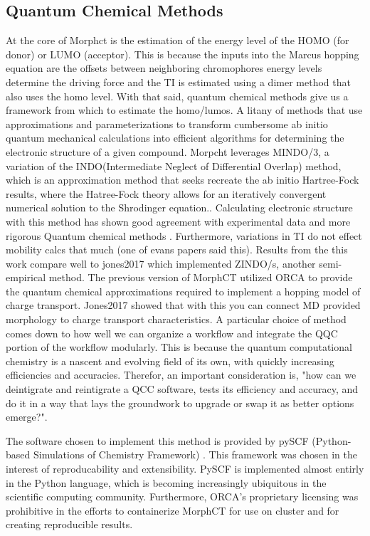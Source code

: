 \subsection{Quantum Chemical Methods}

At the core of Morphct is the estimation of the energy level of the HOMO (for donor) or LUMO (acceptor). This is because 
the inputs into the Marcus hopping equation are the offsets between neighboring  chromophores energy levels
determine the driving force and the TI is estimated using a dimer method that also uses the homo level. 
With that said, quantum chemical methods give us a framework from which to estimate the homo/lumos. A litany of
methods that use approximations and parameterizations to transform cumbersome ab initio quantum mechanical 
calculations into efficient algorithms for determining the electronic structure of a given compound. Morpcht 
leverages MINDO/3, a variation of the INDO(Intermediate Neglect of Differential Overlap) method,
which is an approximation method that seeks recreate the ab initio Hartree-Fock
results, where the Hatree-Fock theory allows for an iteratively convergent numerical solution to the Shrodinger equation.\cite{Thiel2014}. Calculating electronic structure with this method has
shown good agreement with experimental data and more rigorous Quantum chemical
methods 
\cite{Bredas2002}. Furthermore, variations in TI do not effect mobility calcs
that much (one of evans papers said this).  Results
from the this work compare well to jones2017 which implemented ZINDO/s, another
semi-empirical method. The
previous version of MorphCT utilized ORCA \cite{Neese2012b}to provide the quantum chemical
approximations required to implement
a hopping model of charge transport. Jones2017 showed that with this you can connect MD
provided morphology to charge transport characteristics. A particular 
choice of method comes down to how well we can organize a workflow and integrate the QQC portion of the
workflow modularly. This is because the quantum computational chemistry is a nascent and evolving field of its
own, with quickly increasing efficiencies and accuracies. Therefor, an important consideration is, "how can we
deintigrate and reintigrate a QCC software, tests its efficiency and accuracy, and do it in a way that lays
the groundwork to upgrade or swap it as better options emerge?". 

The software chosen to implement this method is
provided by pySCF (Python-based Simulations of Chemistry Framework) \cite{Sun2018a}. This framework
was chosen in the interest of reproducability and extensibility. PySCF is implemented almost entirly in the Python 
language, which is becoming increasingly ubiquitous in the scientific computing community. Furthermore,
ORCA's proprietary licensing was prohibitive in the efforts to containerize MorphCT for use on cluster and for
creating reproducible results. 

